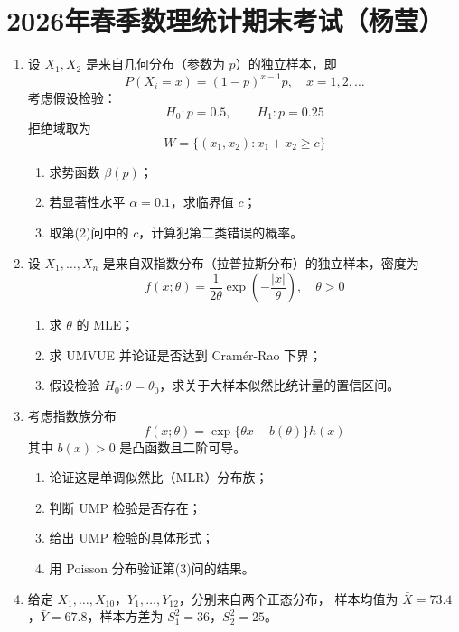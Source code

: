 \section{2026年春季数理统计期末考试（杨莹）}
\begin{enumerate}
\item 设 $X_1, X_2$ 是来自几何分布（参数为 $p$）的独立样本，即
\[
P(X_i=x)=(1-p)^{x-1}p,\quad x=1,2,\dots
\]
考虑假设检验：
\[
H_0:p=0.5,\qquad H_1:p=0.25
\]
拒绝域取为
\[
W=\{(x_1,x_2):x_1+x_2\ge c\}
\]

\begin{enumerate}
\item 求势函数 $\beta(p)$；
\item 若显著性水平 $\alpha=0.1$，求临界值 $c$；
\item 取第(2)问中的 $c$，计算犯第二类错误的概率。
\end{enumerate}

\item 设 $X_1,\dots,X_n$ 是来自双指数分布（拉普拉斯分布）的独立样本，密度为
\[
f(x;\theta)=\frac{1}{2\theta}\exp\left(-\frac{|x|}{\theta}\right),\quad \theta>0
\]

\begin{enumerate}
\item 求 $\theta$ 的 MLE；
\item 求 UMVUE 并论证是否达到 Cram\'er-Rao 下界；
\item 假设检验 $H_0:\theta=\theta_0$，求关于大样本似然比统计量的置信区间。
\end{enumerate}


\item 考虑指数族分布
\[
f(x;\theta)=\exp\{\theta x-b(\theta)\}h(x)
\]
其中 $b(x)>0$ 是凸函数且二阶可导。

\begin{enumerate}
\item 论证这是单调似然比（MLR）分布族；
\item 判断 UMP 检验是否存在；
\item 给出 UMP 检验的具体形式；
\item 用 Poisson 分布验证第(3)问的结果。
\end{enumerate}


\item 给定 $X_1,\dots,X_{10}$，$Y_1,\dots,Y_{12}$，分别来自两个正态分布，
样本均值为 $\bar{X}=73.4$，$\bar{Y}=67.8$，样本方差为 $S_1^2=36$，$S_2^2=25$。


\end{enumerate}
